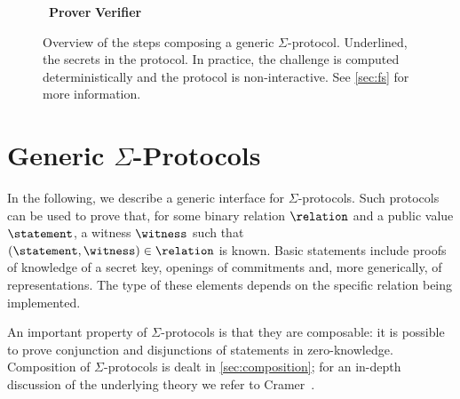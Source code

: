 \documentclass[11pt]{article}
\begin{document}
\begin{figure}[t]
  \begin{tcolorbox}
    \centering
      ~\textbf{Prover} \hfill \textbf{Verifier}~ \\[1em]
      \tcblower
      \begin{center}\end{center}
  \end{tcolorbox}
  \caption{Overview of the steps composing a generic $\Sigma$-protocol. Underlined, the secrets in the protocol. In practice, the challenge is computed deterministically and the protocol is non-interactive. See \cref{sec:fs} for more information.}
\end{figure}

\section{Generic $\Sigma$-Protocols}
In the following, we describe a generic interface for $\Sigma$-protocols.
Such protocols can be used to prove that, for some binary relation $\relation$ and a public value $\statement$, a witness $\witness$ such that $(\statement,\witness)\in\relation$ is known.
Basic statements include proofs of knowledge of a secret key, openings of commitments and, more generically, of representations.
The type of these elements depends on the specific relation being implemented.

An important property of $\Sigma$-protocols is that they are composable: it is possible to prove conjunction and disjunctions of statements in zero-knowledge.
Composition of $\Sigma$-protocols is dealt in \cref{sec:composition}; for an in-depth discussion of the underlying theory we refer to Cramer~\cite{cramer97}.
\end{document}
